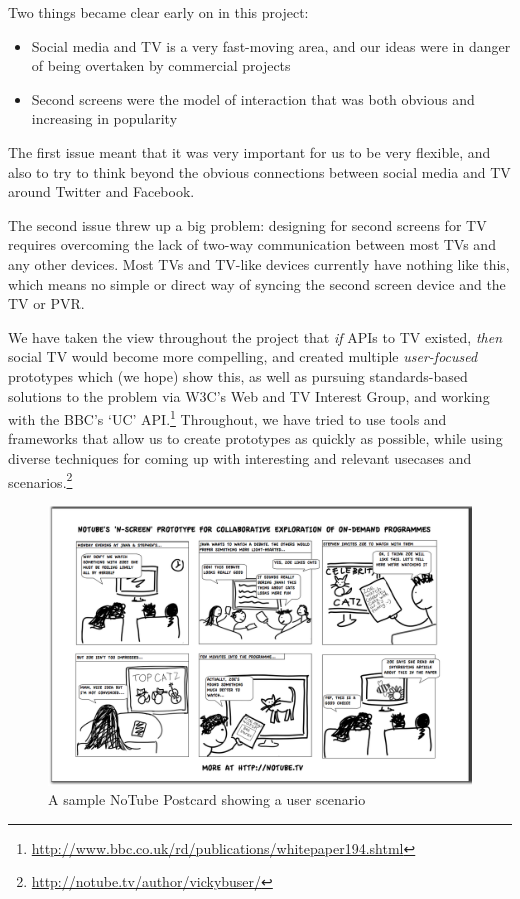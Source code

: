 \documentclass{notube}
\begin{document}
\noindent Two things became clear early on in this project:

\begin{itemize}
\item{Social media and TV is a very fast-moving area, and our ideas were in danger of being overtaken by commercial projects}
\item{Second screens were the model of interaction that was both obvious and increasing in popularity}
\end{itemize}

The first issue meant that it was very important for us to be very flexible, and also to try to think beyond the obvious connections between social media and TV around Twitter and Facebook.

The second issue threw up a big problem: designing for second screens for TV requires overcoming the lack of two-way communication between most TVs and any other devices. Most TVs and TV-like devices currently have nothing like this, which means no simple or direct way of syncing the second screen device and the TV or PVR. 

We have taken the view throughout the project that \emph{if} APIs to TV existed, \emph{then} social TV would become more compelling, and created multiple \emph{user-focused} prototypes which (we hope) show this, as well as pursuing standards-based solutions to the problem via W3C's Web and TV Interest Group, and working with the BBC's `UC' API.\footnote{\url{http://www.bbc.co.uk/rd/publications/whitepaper194.shtml}} Throughout, we have tried to use tools and frameworks that allow us to create prototypes as quickly as possible, while using diverse techniques for coming up with interesting and relevant usecases and scenarios.\footnote{\url{http://notube.tv/author/vickybuser/}}

\begin{figure}[htbp]
\begin{center}
\includegraphics[width=6in]{images/postcard.png}
\caption{A sample NoTube Postcard showing a user scenario} \label{fig:postcard}
\end{center}
\end{figure} 
\end{document}
